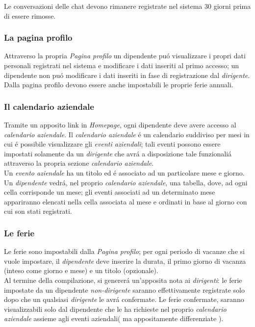 \documentclass[paper=a4, fontsize=11pt]{scrartcl} %
\numberwithin{equation}{section} %
\numberwithin{figure}{section} %
\numberwithin{table}{section} %
\begin{document}
Le conversazioni delle chat devono rimanere registrate nel sistema 30 giorni prima di essere rimosse.

\subsubsection{La pagina profilo}
Attraverso la propria \textit{Pagina profilo} un dipendente pu\'o visualizzare i propri dati personali
registrati nel sistema e modificare i dati inseriti al primo accesso;
un dipendente non pu\'o modificare i dati inseriti in fase di registrazione dal \textit{dirigente}.\\
Dalla pagina profilo devono essere anche impostabili le proprie ferie annuali.

\subsubsection{Il calendario aziendale}

Tramite un apposito link in \textit{Homepage}, ogni dipendente deve avere accesso al \textit{calendario aziendale}.
Il \textit{calendario aziendale} \'e un calendario suddiviso per mesi in cui \'e possibile visualizzare gli \textit{eventi aziendali};
tali eventi possono essere impostati solamente da un \textit{dirigente} che avr\'a a disposizione tale funzionali\'a attraverso
la propria sezione \textit{calendario aziendale}.\\
Un \textit{evento aziendale}  ha un titolo ed \'e associato ad un particolare mese e giorno.\\

Un \textit{dipendente} vedr\'a, nel proprio \textit{calendario aziendale}, una tabella, dove, ad ogni cella
corrisponde un mese; gli eventi associati ad un determinato mese appariranno elencati nella cella associata al mese
e ordinati in base al giorno con cui son stati registrati.



\subsubsection{Le ferie}
Le ferie sono impostabili dalla \textit{Pagina profilo}; per ogni periodo di vacanze che si vuole impostare,
il \textit{dipendente} deve inserire la durata, il primo giorno di vacanza (inteso come giorno e mese) e un titolo (opzionale).\\
Al termine della compilazione, si generer\'a un'apposita nota ai \textit{dirigenti}: le ferie impostate da un dipendente
\textit{non-dirigente} saranno effettivamente registrate solo dopo che un qualsiasi \textit{dirigente} le avr\'a confermate.
Le ferie confermate, saranno visualizzabili solo dal dipendente che le ha richieste nel proprio \textit{calendario aziendale}
 assieme agli eventi aziendali( ma appositamente differenziate ).
\end{document}
